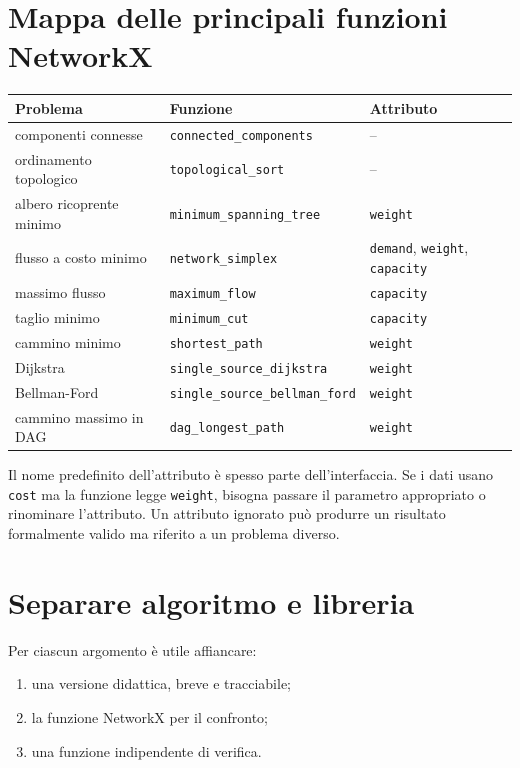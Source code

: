 \documentclass[11pt,a4paper]{article}
\begin{document}
\section{Mappa delle principali funzioni NetworkX}
\begin{center}\small
\begin{tabular}{lll}\toprule
Problema&Funzione&Attributo\\\midrule
componenti connesse&\texttt{connected\_components}&--\\
ordinamento topologico&\texttt{topological\_sort}&--\\
albero ricoprente minimo&\texttt{minimum\_spanning\_tree}&\texttt{weight}\\
flusso a costo minimo&\texttt{network\_simplex}&\texttt{demand}, \texttt{weight}, \texttt{capacity}\\
massimo flusso&\texttt{maximum\_flow}&\texttt{capacity}\\
taglio minimo&\texttt{minimum\_cut}&\texttt{capacity}\\
cammino minimo&\texttt{shortest\_path}&\texttt{weight}\\
Dijkstra&\texttt{single\_source\_dijkstra}&\texttt{weight}\\
Bellman-Ford&\texttt{single\_source\_bellman\_ford}&\texttt{weight}\\
cammino massimo in DAG&\texttt{dag\_longest\_path}&\texttt{weight}\\
\bottomrule\end{tabular}\end{center}

\begin{warningbox}
Il nome predefinito dell'attributo è spesso parte dell'interfaccia. Se i dati usano \texttt{cost} ma la funzione legge \texttt{weight}, bisogna passare il parametro appropriato o rinominare l'attributo. Un attributo ignorato può produrre un risultato formalmente valido ma riferito a un problema diverso.
\end{warningbox}

\section{Separare algoritmo e libreria}
Per ciascun argomento è utile affiancare:
\begin{enumerate}
\item una versione didattica, breve e tracciabile;
\item la funzione NetworkX per il confronto;
\item una funzione indipendente di verifica.
\end{enumerate}
\end{document}
